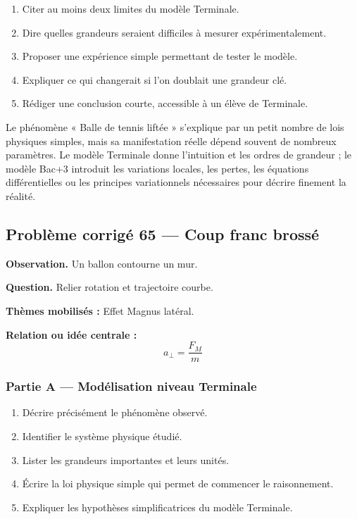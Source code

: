 \documentclass[11pt,a4paper]{article}
\begin{document}
\begin{enumerate}
  \item Citer au moins deux limites du modèle Terminale.
  \item Dire quelles grandeurs seraient difficiles à mesurer expérimentalement.
  \item Proposer une expérience simple permettant de tester le modèle.
  \item Expliquer ce qui changerait si l'on doublait une grandeur clé.
  \item Rédiger une conclusion courte, accessible à un élève de Terminale.
\end{enumerate}

\begin{corrigebox}
Le phénomène « Balle de tennis liftée » s'explique par un petit nombre de lois physiques simples, mais sa manifestation réelle dépend souvent de nombreux paramètres. Le modèle Terminale donne l'intuition et les ordres de grandeur ; le modèle Bac+3 introduit les variations locales, les pertes, les équations différentielles ou les principes variationnels nécessaires pour décrire finement la réalité.
\end{corrigebox}

\subsection{Problème corrigé 65 — Coup franc brossé}

\begin{exercicebox}
\textbf{Observation.} Un ballon contourne un mur.

\medskip
\textbf{Question.} Relier rotation et trajectoire courbe.

\medskip
\textbf{Thèmes mobilisés :} Effet Magnus latéral.

\medskip
\textbf{Relation ou idée centrale :}
\[
a_\perp=\frac{F_M}{m}
\]
\end{exercicebox}

\subsubsection*{Partie A — Modélisation niveau Terminale}

\begin{enumerate}
  \item Décrire précisément le phénomène observé.
  \item Identifier le système physique étudié.
  \item Lister les grandeurs importantes et leurs unités.
  \item Écrire la loi physique simple qui permet de commencer le raisonnement.
  \item Expliquer les hypothèses simplificatrices du modèle Terminale.
\end{enumerate}
\end{document}

